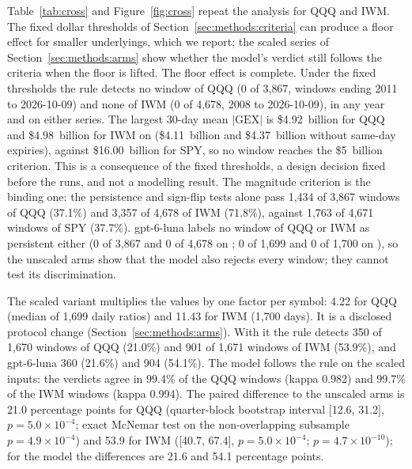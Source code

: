 Table~\ref{tab:cross} and Figure~\ref{fig:cross} repeat the analysis for QQQ and IWM. The fixed dollar thresholds of Section~\ref{sec:methods:criteria} can produce a floor effect for smaller underlyings, which we report; the scaled series of Section~\ref{sec:methods:arms} show whether the model's verdict still follows the criteria when the floor is lifted.
The floor effect is complete. Under the fixed thresholds the rule detects no window of QQQ (0 of 3{,}867, windows ending 2011 to 2026-10-09) and none of IWM (0 of 4{,}678, 2008 to 2026-10-09), in any year and on either series. The largest 30-day mean $|\mathrm{GEX}|$ is \$4.92~billion for QQQ and \$4.98~billion for IWM on  (\$4.11~billion and \$4.37~billion without same-day expiries), against \$16.00~billion for SPY, so no window reaches the \$5~billion criterion. This is a consequence of the fixed thresholds, a design decision fixed before the runs, and not a modelling result. The magnitude criterion is the binding one: the persistence and sign-flip tests alone pass 1{,}434 of 3{,}867 windows of QQQ (37.1\%) and 3{,}357 of 4{,}678 of IWM (71.8\%), against 1{,}763 of 4{,}671 windows of SPY (37.7\%). gpt-6-luna labels no window of QQQ or IWM as persistent either (0 of 3{,}867 and 0 of 4{,}678 on ; 0 of 1{,}699 and 0 of 1{,}700 on ), so the unscaled arms show that the model also rejects every window; they cannot test its discrimination.

The scaled variant multiplies the  values by one factor per symbol: 4.22 for QQQ (median of 1{,}699 daily ratios) and 11.43 for IWM (1{,}700 days). It is a disclosed protocol change (Section~\ref{sec:methods:arms}). With it the rule detects 350 of 1{,}670 windows of QQQ (21.0\%) and 901 of 1{,}671 windows of IWM (53.9\%), and gpt-6-luna 360 (21.6\%) and 904 (54.1\%). The model follows the rule on the scaled inputs: the verdicts agree in 99.4\% of the QQQ windows (kappa 0.982) and 99.7\% of the IWM windows (kappa 0.994). The paired difference to the unscaled arms is 21.0 percentage points for QQQ (quarter-block bootstrap interval [12.6, 31.2], $p=5.0\times10^{-4}$; exact McNemar test on the non-overlapping subsample $p=4.9\times10^{-4}$) and 53.9 for IWM ([40.7, 67.4], $p=5.0\times10^{-4}$; $p=4.7\times10^{-10}$); for the model the differences are 21.6 and 54.1 percentage points.

